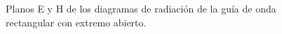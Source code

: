 \begin{figure} [H]
\centering 
{}
\hspace{5mm}
\caption{Planos E y H de los diagramas de radiación de la guía de onda rectangular con extremo abierto.}
\label{grup_fig_estudio:5}
\end{figure}
